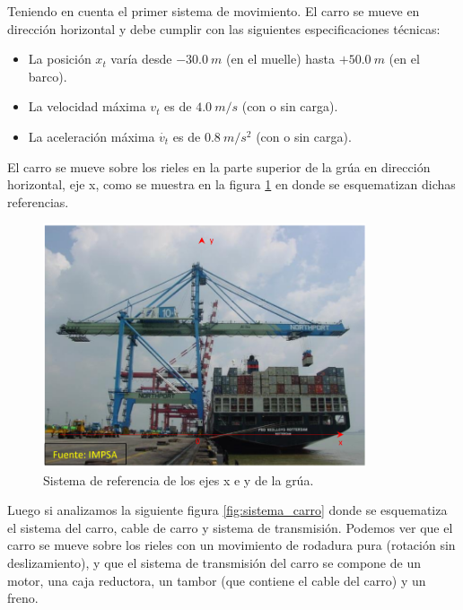 \documentclass[11pt]{article}
\begin{document}
Teniendo en cuenta el primer sistema de movimiento. El carro se mueve en dirección horizontal y debe cumplir con las siguientes especificaciones técnicas:
\begin{itemize}
	\item La posición $x_{t}$ varía desde $-30.0\ m$ (en el muelle) hasta $+50.0\ m$ (en el barco).
	\item La velocidad máxima $v_{t}$ es de $4.0\ m/s$ (con o sin carga).
	\item La aceleración máxima $\dot{v_{t}}$ es de $0.8\ m/s^{2}$ (con o sin carga).
\end{itemize}

El carro se mueve sobre los rieles en la parte superior de la grúa en dirección horizontal, eje x, como se muestra en la figura \ref{fig:ref_grua} en donde se esquematizan dichas referencias.

\begin{figure}[h!]
	\centering
	\includegraphics[width=0.85\textwidth]{images/imagen_1_sistema_ref_grua.png}
	\caption{\label{fig:ref_grua} Sistema de referencia de los ejes x e y de la grúa.}
\end{figure}

Luego si analizamos la siguiente figura \ref{fig:sistema_carro} donde se esquematiza el sistema del carro, cable de carro y sistema de transmisión. Podemos ver que el carro se mueve sobre los rieles con un movimiento de rodadura pura (rotación sin deslizamiento), y que el sistema de transmisión del carro se compone de un motor, una caja reductora, un tambor (que contiene el cable del carro) y un freno.
\end{document}
